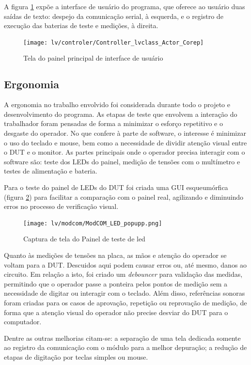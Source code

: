             A figura \ref{fig:cntrlpanel} expõe a interface de usuário do programa, que oferece ao usuário duas saídas de texto: despejo da comunicação serial, à esquerda, e o registro de execução das baterias de teste e medições, à direita. 
            
            \begin{figure}
                    \centering
                    \texttt{[image: lv/controler/Controller\_lvclass\_Actor\_Corep]}
                    \caption{Tela do painel principal de interface de usuário}
                    \label{fig:cntrlpanel}
            \end{figure}
        
        \subsection{Ergonomia}
        \label{ergo}
            
            
            A ergonomia no trabalho envolvido foi considerada durante todo o projeto e desenvolvimento do programa. As etapas de teste que envolvem a interação do trabalhador foram pensadas de forma a minimizar o esforço repetitivo e o desgaste do operador. No que confere à parte de software, o interesse é minimizar o uso do teclado e mouse, bem como a necessidade de dividir atenção visual entre o DUT e o monitor. As partes principais onde o operador precisa interagir com o software são: teste dos LEDs do painel, medição de tensões com o multímetro e testes de alimentação e bateria. 
            
            Para o teste do painel de LEDs do DUT foi criada uma GUI esqueumórfica (figura \ref{fig:modcomledp}) para facilitar a comparação com o painel real, agilizando e diminuindo erros no processo de verificação visual.
            
            \begin{figure}
                \centering
                \texttt{[image: lv/modcom/ModCOM\_LED\_popupp.png]}
                \caption{Captura de tela do Painel de teste de led}
                \label{fig:modcomledp}
            \end{figure}
            
            Quanto às medições de tensões na placa, as mãos e atenção do operador se voltam para a DUT. Descuidos aqui podem causar erros ou, até mesmo, danos ao circuito. Em relação a isto, foi criado um \textit{debouncer} para validação das medidas, permitindo que o operador passe a ponteira pelos pontos de medição sem a necessidade de digitar ou interagir com o teclado. Além disso, referências sonoras foram criadas para os casos de aprovação, repetição ou reprovação de medição, de forma que a atenção visual do operador não precise desviar do DUT para o computador.
            
            Dentre as outras melhorias citam-se: a separação de uma tela dedicada somente ao registro da comunicação com o módulo para a melhor depuração; a redução de etapas de digitação por teclas simples ou mouse. 
        
\clearpage
